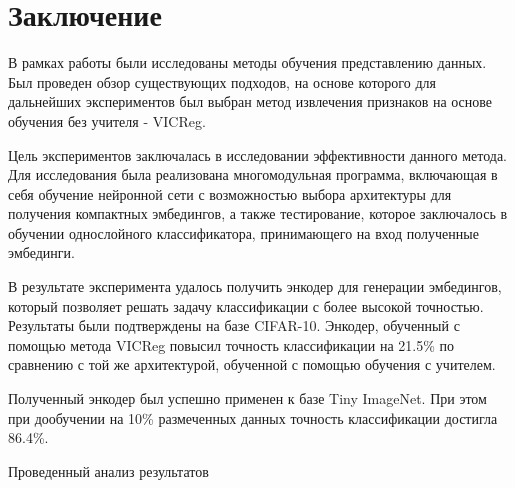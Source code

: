 \section{Заключение}
\label{sec:Chapter7} 

В рамках работы были исследованы методы обучения представлению данных. Был проведен обзор существующих подходов, на основе которого для дальнейших экспериментов был выбран метод извлечения признаков на основе обучения без учителя - VICReg.

Цель экспериментов заключалась в исследовании эффективности данного метода. Для исследования была реализована многомодульная программа, включающая в себя обучение нейронной сети с возможностью выбора архитектуры для получения компактных эмбедингов, а также тестирование, которое заключалось в обучении однослойного классификатора, принимающего на вход полученные эмбединги.  

В результате эксперимента удалось получить энкодер для генерации эмбедингов, который позволяет решать задачу классификации с более высокой точностью. Результаты были подтверждены на базе CIFAR-10. Энкодер, обученный с помощью метода VICReg повысил точность классификации на 21.5\% по сравнению с той же архитектурой, обученной с помощью обучения с учителем.

Полученный энкодер был успешно применен к базе Tiny ImageNet. При этом при дообучении на 10\% размеченных данных точность классификации достигла 86.4\%.

Проведенный анализ результатов 